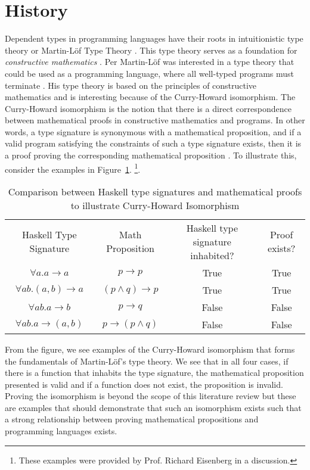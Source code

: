 \section{History}

Dependent types in programming languages have their roots in intuitionistic type
theory or Martin-L\"{o}f Type Theory \cite{intro_martin_lof,ml_type_theory}.
This type theory serves as a foundation for \textit{constructive mathematics}
\cite{martin_lof}. Per Martin-L\"{o}f was interested in a type theory that could
be used as a programming language, where all well-typed programs must terminate
\cite{ml_type_theory}. His type theory is based on the principles of
constructive mathematics and is interesting because of the Curry-Howard
isomorphism. The Curry-Howard isomorphism is the notion that there is a direct
correspondence between mathematical proofs in constructive mathematics and
programs. In other words, a type signature is synonymous with a mathematical
proposition, and if a valid program satisfying the constraints of such a type
signature exists, then it is a proof proving the corresponding mathematical
proposition \cite{martin_lof,ml_type_theory}. To illustrate this, consider the
examples in Figure~\ref{ml_type_theory_examples}. 
\footnote{These examples were provided by Prof. Richard Eisenberg in a
discussion.}. 

\begin{table}[h]
    \begin{tabular}{|c|c|c|c|}
        Haskell Type Signature & Math Proposition & Haskell type signature inhabited? & Proof exists? \\
        $\forall a. a \rightarrow a$ & $p \rightarrow p$ & True & True \\
        $\forall ab. (a,b) \rightarrow a$ & $ (p \wedge q) \rightarrow p$ & True & True \\
        $\forall ab. a \rightarrow b$ & $p\rightarrow q$ & False & False \\
        $\forall ab. a \rightarrow (a,b)$ & $p \rightarrow (p\wedge q)$ & False & False 
    \end{tabular}
    \caption{Comparison between Haskell type signatures and mathematical proofs to illustrate Curry-Howard Isomorphism}
    \label{ml_type_theory_examples}
\end{table}

From the figure, we see examples of the Curry-Howard isomorphism that forms the
fundamentals of Martin-L\"{o}f's type theory. We see that in all four cases, if
there is a function that inhabits the type signature, the mathematical
proposition presented is valid and if a function does not exist, the proposition
is invalid. Proving the isomorphism is beyond the scope of this literature
review but these are examples that should demonstrate that such an isomorphism
exists such that a strong relationship between proving mathematical propositions
and programming languages exists.

